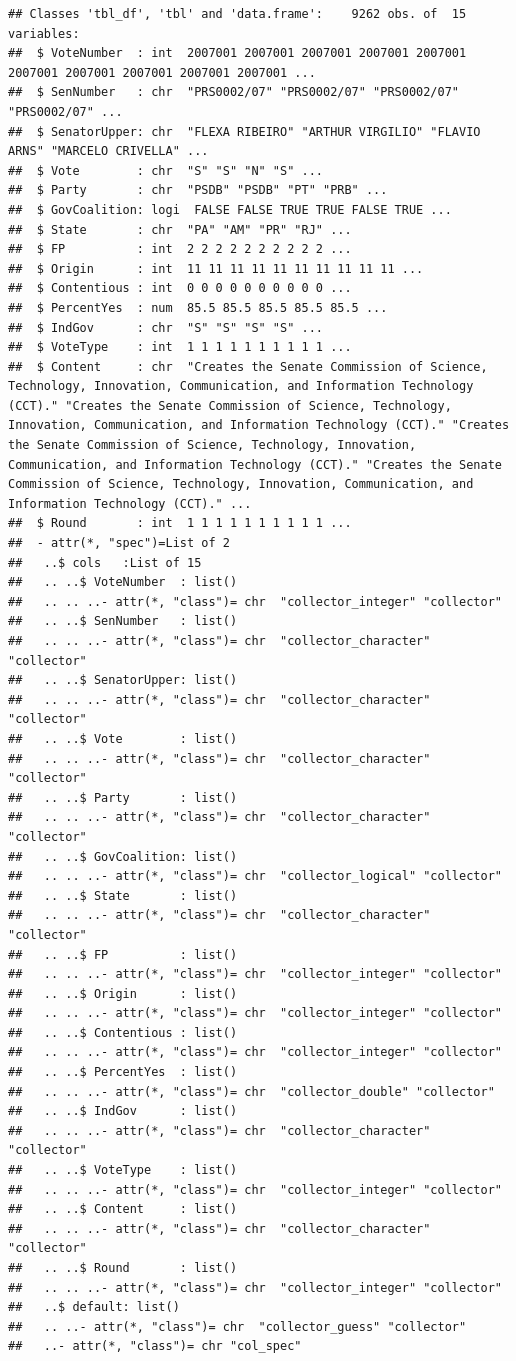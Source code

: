 \documentclass[]{book}
\begin{document}
\begin{verbatim}
## Classes 'tbl_df', 'tbl' and 'data.frame':    9262 obs. of  15 variables:
##  $ VoteNumber  : int  2007001 2007001 2007001 2007001 2007001 2007001 2007001 2007001 2007001 2007001 ...
##  $ SenNumber   : chr  "PRS0002/07" "PRS0002/07" "PRS0002/07" "PRS0002/07" ...
##  $ SenatorUpper: chr  "FLEXA RIBEIRO" "ARTHUR VIRGILIO" "FLAVIO ARNS" "MARCELO CRIVELLA" ...
##  $ Vote        : chr  "S" "S" "N" "S" ...
##  $ Party       : chr  "PSDB" "PSDB" "PT" "PRB" ...
##  $ GovCoalition: logi  FALSE FALSE TRUE TRUE FALSE TRUE ...
##  $ State       : chr  "PA" "AM" "PR" "RJ" ...
##  $ FP          : int  2 2 2 2 2 2 2 2 2 2 ...
##  $ Origin      : int  11 11 11 11 11 11 11 11 11 11 ...
##  $ Contentious : int  0 0 0 0 0 0 0 0 0 0 ...
##  $ PercentYes  : num  85.5 85.5 85.5 85.5 85.5 ...
##  $ IndGov      : chr  "S" "S" "S" "S" ...
##  $ VoteType    : int  1 1 1 1 1 1 1 1 1 1 ...
##  $ Content     : chr  "Creates the Senate Commission of Science, Technology, Innovation, Communication, and Information Technology (CCT)." "Creates the Senate Commission of Science, Technology, Innovation, Communication, and Information Technology (CCT)." "Creates the Senate Commission of Science, Technology, Innovation, Communication, and Information Technology (CCT)." "Creates the Senate Commission of Science, Technology, Innovation, Communication, and Information Technology (CCT)." ...
##  $ Round       : int  1 1 1 1 1 1 1 1 1 1 ...
##  - attr(*, "spec")=List of 2
##   ..$ cols   :List of 15
##   .. ..$ VoteNumber  : list()
##   .. .. ..- attr(*, "class")= chr  "collector_integer" "collector"
##   .. ..$ SenNumber   : list()
##   .. .. ..- attr(*, "class")= chr  "collector_character" "collector"
##   .. ..$ SenatorUpper: list()
##   .. .. ..- attr(*, "class")= chr  "collector_character" "collector"
##   .. ..$ Vote        : list()
##   .. .. ..- attr(*, "class")= chr  "collector_character" "collector"
##   .. ..$ Party       : list()
##   .. .. ..- attr(*, "class")= chr  "collector_character" "collector"
##   .. ..$ GovCoalition: list()
##   .. .. ..- attr(*, "class")= chr  "collector_logical" "collector"
##   .. ..$ State       : list()
##   .. .. ..- attr(*, "class")= chr  "collector_character" "collector"
##   .. ..$ FP          : list()
##   .. .. ..- attr(*, "class")= chr  "collector_integer" "collector"
##   .. ..$ Origin      : list()
##   .. .. ..- attr(*, "class")= chr  "collector_integer" "collector"
##   .. ..$ Contentious : list()
##   .. .. ..- attr(*, "class")= chr  "collector_integer" "collector"
##   .. ..$ PercentYes  : list()
##   .. .. ..- attr(*, "class")= chr  "collector_double" "collector"
##   .. ..$ IndGov      : list()
##   .. .. ..- attr(*, "class")= chr  "collector_character" "collector"
##   .. ..$ VoteType    : list()
##   .. .. ..- attr(*, "class")= chr  "collector_integer" "collector"
##   .. ..$ Content     : list()
##   .. .. ..- attr(*, "class")= chr  "collector_character" "collector"
##   .. ..$ Round       : list()
##   .. .. ..- attr(*, "class")= chr  "collector_integer" "collector"
##   ..$ default: list()
##   .. ..- attr(*, "class")= chr  "collector_guess" "collector"
##   ..- attr(*, "class")= chr "col_spec"
\end{verbatim}
\end{document}
